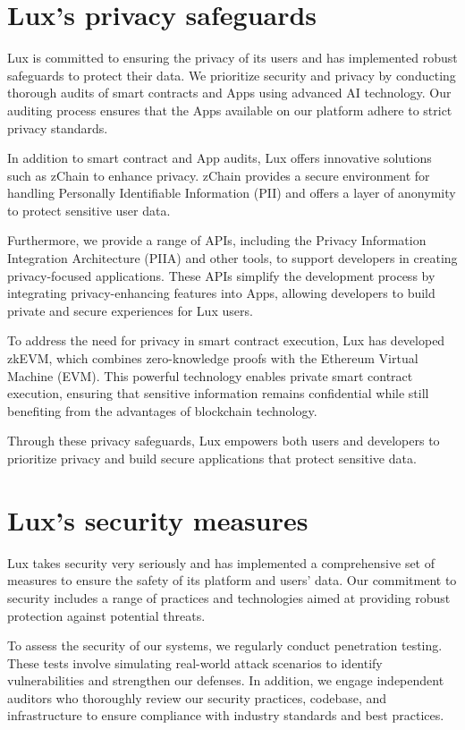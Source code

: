 \documentclass[11pt]{article}
\begin{document}
\section{Lux's privacy safeguards}

Lux is committed to ensuring the privacy of its users and has implemented robust safeguards to protect their data. We prioritize security and privacy by conducting thorough audits of smart contracts and Apps using advanced AI technology. Our auditing process ensures that the Apps available on our platform adhere to strict privacy standards.


In addition to smart contract and App audits, Lux offers innovative solutions such as zChain to enhance privacy. zChain provides a secure environment for handling Personally Identifiable Information (PII) and offers a layer of anonymity to protect sensitive user data.


Furthermore, we provide a range of APIs, including the Privacy Information Integration Architecture (PIIA) and other tools, to support developers in creating privacy-focused applications. These APIs simplify the development process by integrating privacy-enhancing features into Apps, allowing developers to build private and secure experiences for Lux users.


To address the need for privacy in smart contract execution, Lux has developed zkEVM, which combines zero-knowledge proofs with the Ethereum Virtual Machine (EVM). This powerful technology enables private smart contract execution, ensuring that sensitive information remains confidential while still benefiting from the advantages of blockchain technology.


Through these privacy safeguards, Lux empowers both users and developers to prioritize privacy and build secure applications that protect sensitive data.


\section{Lux's security measures}

Lux takes security very seriously and has implemented a comprehensive set of measures to ensure the safety of its platform and users' data. Our commitment to security includes a range of practices and technologies aimed at providing robust protection against potential threats.


To assess the security of our systems, we regularly conduct penetration testing. These tests involve simulating real-world attack scenarios to identify vulnerabilities and strengthen our defenses. In addition, we engage independent auditors who thoroughly review our security practices, codebase, and infrastructure to ensure compliance with industry standards and best practices.
\end{document}
